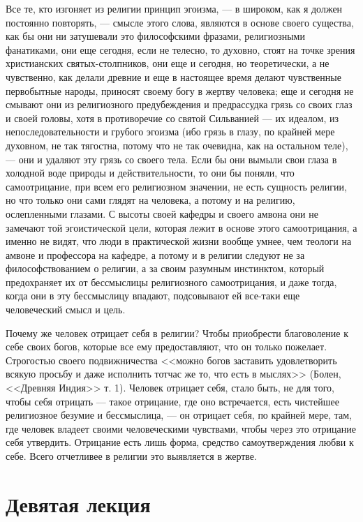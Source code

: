 \documentclass[12pt]{article}
\begin{document}
Все те, кто изгоняет из религии принцип эгоизма, --- в широком, как я должен постоянно повторять, --- смысле этого слова, являются в основе своего существа, как бы они ни затушевали это философскими фразами, религиозными фанатиками, они еще сегодня, если не телесно, то духовно, стоят на точке зрения христианских святых-столпников, они еще и сегодня, но теоретически, а не чувственно, как делали древние и еще в настоящее время делают чувственные первобытные народы, приносят своему богу в жертву человека; еще и сегодня не смывают они из религиозного предубеждения и предрассудка грязь со своих глаз и своей головы, хотя в противоречие со святой Сильванией --- их идеалом, из непоследовательности и грубого эгоизма (ибо грязь в глазу, по крайней мере духовном, не так тягостна, потому что не так очевидна, как на остальном теле), --- они и удаляют эту грязь со своего тела. Если бы они вымыли свои глаза в холодной воде природы и действительности, то они бы поняли, что самоотрицание, при всем его религиозном значении, не есть сущность религии, но что только они сами глядят на человека, а потому и на религию, ослепленными глазами. С высоты своей кафедры и своего амвона они не замечают той эгоистической цели, которая лежит в основе этого самоотрицания, а именно не видят, что люди в практической жизни вообще умнее, чем теологи на амвоне и профессора на кафедре, а потому и в религии следуют не за философствованием о религии, а за своим разумным инстинктом, который предохраняет их от бессмыслицы религиозного самоотрицания, и даже тогда, когда они в эту бессмыслицу впадают, подсовывают ей все-таки еще человеческий смысл и цель. 

Почему же человек отрицает себя в религии? Чтобы приобрести благоволение к себе своих богов, которые все ему предоставляют, что он только пожелает. Строгостью своего подвижничества <<можно богов заставить удовлетворить всякую просьбу и даже исполнить тотчас же то, что есть в мыслях>> (Болен, <<Древняя Индия>>  т. 1). Человек отрицает себя, стало быть, не для того, чтобы себя отрицать --- такое отрицание, где оно встречается, есть чистейшее религиозное безумие и бессмыслица, --- он отрицает себя, по крайней мере, там, где человек владеет своими человеческими чувствами, чтобы через это отрицание себя утвердить. Отрицание есть лишь форма, средство самоутверждения любви к себе. Всего отчетливее в религии это выявляется в жертве. 

\section*{Девятая лекция}
\end{document}
